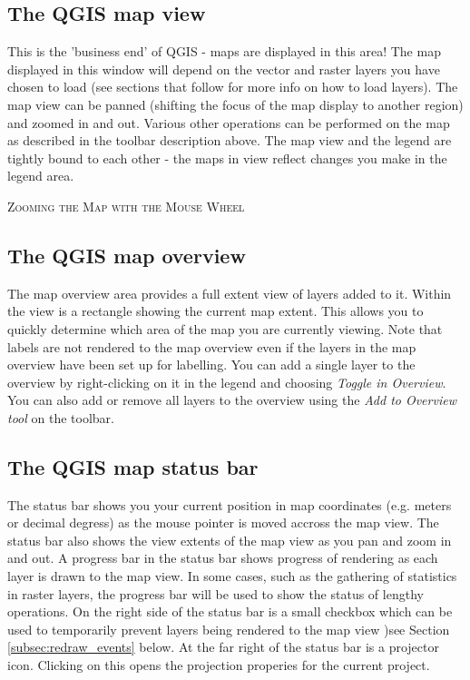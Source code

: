 \subsection{The QGIS map view}
This is the 'business end' of QGIS - maps are displayed in this area! The map
displayed in this window will depend on the vector and raster layers you have
chosen to load (see sections that follow for more info on how to load layers).
The map view can be panned (shifting the focus of the map display to another
region) and zoomed in and out. Various other operations can be performed on
the map as described in the toolbar description above.  The map view and the
legend are tightly bound to each other - the maps in view reflect changes you
make in the legend area.  
\begin{Tip}\caption{\textsc{Zooming the Map with the Mouse
Wheel}}
\end{Tip}
\subsection{The QGIS map overview}
The map overview area provides a full extent view of layers added to it.
Within the view is a rectangle showing the current map extent. This allows you
to quickly determine which area of the map you are currently viewing. Note
that labels are not rendered to the map overview even if the layers in the map
overview have been set up for labelling. You can add a single layer to the
overview by right-clicking on it in the legend and choosing \textit{Toggle in
Overview}. You can also add or remove all layers to the overview using the
\textit{Add to Overview tool} on the toolbar.

\subsection{The QGIS map status bar} 
The status bar shows you your current position in map coordinates (e.g. meters
or decimal degress) as the mouse pointer is moved accross the map view. The
status bar also shows the view extents of the map view as you pan and zoom in
and out. A progress bar in the status bar shows progress of rendering as each
layer is drawn to the map view. In some cases, such as the gathering of
statistics in raster layers, the progress bar will be used to show the status
of lengthy operations. On the right side of the status bar is a small checkbox which
can be used to temporarily prevent layers being rendered to the map view )see
Section \ref{subsec:redraw_events} below. At the far right of the status bar
is a projector icon. Clicking on this opens the projection properies for the
current project.

